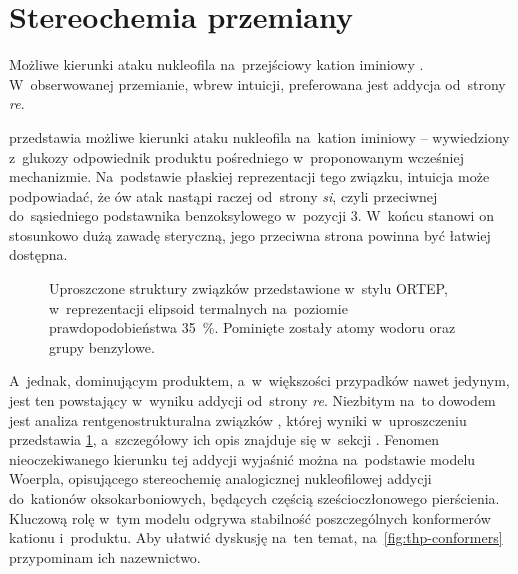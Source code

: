 \section{Stereochemia przemiany}\label{numeric:stereo}

\begin{marginfigure}[10\baselineskip]
  
  \caption{
    Możliwe kierunki ataku nukleofila na~przejściowy kation iminiowy .
    W~obserwowanej przemianie, wbrew intuicji, preferowana jest addycja od~strony \textit{re}.
  }\label{fig:direction}
\end{marginfigure}

 przedstawia możliwe kierunki ataku nukleofila na~kation iminiowy
   \--- wywiedziony z~glukozy odpowiednik produktu pośredniego 
  w~proponowanym wcześniej mechanizmie.
Na~podstawie płaskiej reprezentacji tego związku, intuicja może podpowiadać, że ów atak
  nastąpi raczej od~strony \textit{si}, czyli przeciwnej do~sąsiedniego podstawnika
  benzoksylowego w~pozycji 3.
W~końcu stanowi on stosunkowo dużą zawadę steryczną, jego przeciwna strona powinna być
  łatwiej dostępna.

\begin{figure}
  
  \caption{
    Uproszczone struktury związków  przedstawione
      w~stylu ORTEP, w~reprezentacji elipsoid termalnych na~poziomie prawdopodobieństwa
      \SI{35}{\percent}.
    Pominięte zostały atomy wodoru oraz grupy benzylowe.
  }\label{fig:xray}
\end{figure}

A~jednak, dominującym produktem, a~w~większości przypadków nawet jedynym,
  jest ten powstający w~wyniku addycji od~strony \textit{re}.
Niezbitym na~to dowodem jest analiza rentgenostrukturalna związków
  , której wyniki w~uproszczeniu przedstawia \cref{fig:xray},
  a~szczegółowy ich opis znajduje się w~sekcji .
Fenomen nieoczekiwanego kierunku tej addycji wyjaśnić można na~podstawie modelu Woerpla,
  opisującego stereochemię analogicznej nukleofilowej addycji do~kationów oksokarboniowych,
  będących częścią sześcioczłonowego pierścienia.
Kluczową rolę w~tym modelu odgrywa stabilność poszczególnych konformerów kationu i~produktu.
Aby ułatwić dyskusję na~ten temat,
  na~\cref{fig:thp-conformers} przypominam ich nazewnictwo.

